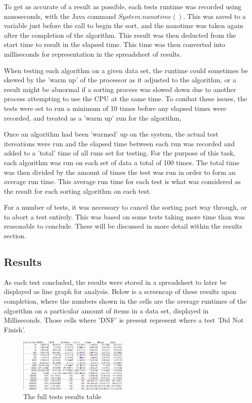 \documentclass{acm_proc_article-sp}
\begin{document}
To get as accurate of a result as possible, each tests runtime was recorded
using nanoseconds, with the Java command \begin{math} System.nanotime() \end{math}.
This was saved to a variable just before the call to begin the sort, and the nanotime was taken again after the completion of the algorithm. This result was then deducted from the start time to result in the elapsed time.
This time was then converted into milliseconds for representation in the spreadsheet of results.

When testing each algorithm on a given data set, the runtime could sometimes be
skewed by the 'warm up' of the processor as it adjusted to the algorithm, or a
result might be abnormal if a sorting process was slowed down due to another process
attempting to use the CPU at the same time. To combat these issues, the
tests were set to run a minimum of 10 times before any elapsed times were recorded,
and treated as  a 'warm up' run for the algorithm,

Once an algorithm had been 'warmed' up on the system, the actual test itereations were run and the elapsed time between
each run was recorded and added to a 'total' time of all runs set for testing. For
the purpose of this task, each algorithm was run on each set of data a total of 100
times. The total time was then divided by the amount of times the test
was run in order to form an average run time. This average run time for each test
is what was considered as the result for each sorting algorithm on each test.

For a number of tests, it was necessary to cancel the sorting part way through, 
or to abort a test entirely. This was based on some tests taking more time than was
reasonable to conclude. These will be discussed in more detail within the
results section.

\subsection{Results}
As each test concluded, the results were stored in a spreadsheet to later
be displayed as line graph for analysis.
Below is a screencap of these results upon completion, where the numbers
shown in the cells are the average runtimes of the algorithm on a particular
amount of items in a data set, displayed in Milliseconds. Those cells where 'DNF' is present 
represent where a test 'Did Not Finish'.

\begin{figure}[h]
\centering
\includegraphics[width=0.48\textwidth]{img/results_table.png}
\caption{The full tests results table}
\end{figure}
\end{document}
